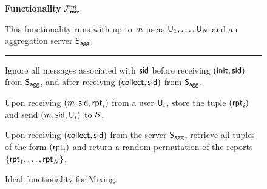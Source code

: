 \begin{figure}[h]
	\begin{center}
		\begin{techbox}
			\centerline{\textbf{Functionality} $\mathcal{F}_{\sf mix}^{m}$}

			This functionality runs with up to $m$ users $\mathsf{U}_1,\dots,\mathsf{U}_{N}$ and an aggregation server $\mathsf{S}_{\mathsf{agg}}$.
			\vspace{1mm}
			\hrule
			\vspace{2mm}
			Ignore all messages associated with ${\sf sid}$ before receiving $({\sf init}, {\sf sid})$ from $\mathsf{S}_{\mathsf{agg}}$, and after receiving $({\sf collect}, {\sf sid})$ from $\mathsf{S}_{\mathsf{agg}}$.

			\begin{algenumerate}
				\item Upon receiving $(m, {\sf sid}, \mathsf{rpt}_i)$ from a user $\mathsf{U}_i$, store the tuple $(\mathsf{rpt}_i)$ and send $(m, {\sf sid}, \mathsf{U}_i)$ to $\mathcal{S}$.
				\item Upon receiving $({\sf collect}, {\sf sid})$ from the server $\mathsf{S}_{\mathsf{agg}}$, retrieve all tuples of the form $(\mathsf{rpt}_i)$ and return a random permutation of the reports $\{\mathsf{rpt}_1, \dots, \mathsf{rpt}_{N}\}$.
			\end{algenumerate}
		\end{techbox}
	\end{center}
	\caption{Ideal functionality for Mixing.}
	\label{fig:ideal_mix}
\end{figure}
